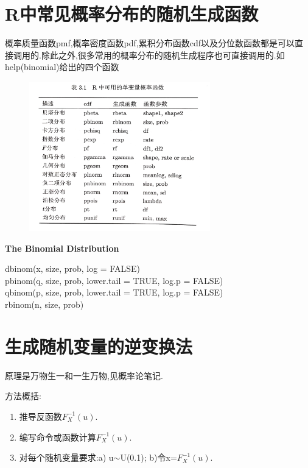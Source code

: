 \documentclass[11pt,a4paper,oneside]{book}
\begin{document}
\section{R中常见概率分布的随机生成函数}
概率质量函数pmf,概率密度函数pdf,累积分布函数cdf以及分位数函数都是可以直接调用的.除此之外,很多常用的概率分布的随机生成程序也可直接调用的.如help(binomial)给出的四个函数
\begin{figure}[H]
	\centering
	\includegraphics[width=0.7\textwidth]{1.jpg}
\end{figure}

\begin{tcolorbox}[colback=pink!10!white,colframe=pink!100!black]
	\textbf{The Binomial Distribution}
	
	dbinom(x, size, prob, log = FALSE)\\        %
	pbinom(q, size, prob, lower.tail = TRUE, log.p = FALSE)\\  %
	qbinom(p, size, prob, lower.tail = TRUE, log.p = FALSE)\\  %
	rbinom(n, size, prob)     %
\end{tcolorbox}
\section{生成随机变量的逆变换法}
原理是万物生一和一生万物,见概率论笔记.

方法概括:
\begin{enumerate}
	\item 推导反函数$F_X^{-1}(u)$.
	\item 编写命令或函数计算$F_X^{-1}(u)$.
	\item 对每个随机变量要求:a) u$\sim$U(0.1); b)令x=$F_X^{-1}(u)$.
\end{enumerate}
\end{document}
